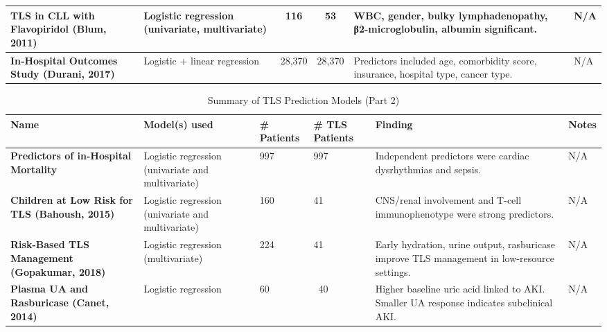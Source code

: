 \documentclass{article}
\begin{document}
\begin{landscape}
\begin{table}[h!]
\begin{tabular}{|L{\colA}|L{\colB}|C{\colC}|C{\colD}|L{\colE}|L{\colF}|}
\hline
\textbf{TLS in CLL with Flavopiridol (Blum, 2011)} & Logistic regression (univariate, multivariate) & 116 & 53 & WBC, gender, bulky lymphadenopathy, β2-microglobulin, albumin significant. & N/A \\

\hline
\textbf{In‐Hospital Outcomes Study (Durani, 2017)} & Logistic + linear regression & 28,370 & 28,370 & Predictors included age, comorbidity score, insurance, hospital type, cancer type. & N/A \\

\hline
\end{tabular}
\end{table}

\vspace{0.5cm}

\begin{table}[h!]
\centering
\caption{Summary of TLS Prediction Models (Part 2)}
\begin{tabular}{|L{\colA}|L{\colB}|L{\colC}|L{\colD}|L{\colE}|L{\colF}|}
\hline
{}
\textbf{Name} & \textbf{Model(s) used} & \textbf{\# Patients} & \textbf{\# TLS Patients} & \textbf{Finding} & \textbf{Notes} \\
\hline

\textbf{Predictors of in-Hospital Mortality} & Logistic regression (univariate and multivariate) & 997 & 997 & Independent predictors were cardiac dysrhythmias and sepsis. & N/A \\

\hline
\textbf{Children at Low Risk for TLS (Bahoush, 2015)} & Logistic regression (univariate and multivariate) & 160 & 41 & CNS/renal involvement and T-cell immunophenotype were strong predictors. & N/A \\

\hline
\textbf{Risk-Based TLS Management (Gopakumar, 2018)} & Logistic regression (multivariate) & 224 & 41 & Early hydration, urine output, rasburicase improve TLS management in low-resource settings. & N/A \\

\hline
\textbf{Plasma UA and Rasburicase (Canet, 2014)} & Logistic regression & 60 & ~40 & Higher baseline uric acid linked to AKI. Smaller UA response indicates subclinical AKI. & N/A \\

\hline
\end{tabular}
\end{table}

\end{landscape}
\end{document}
